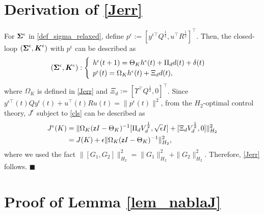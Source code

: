 \documentclass[preprint,5p,times,twocolumn]{elsarticle}
\newcommand{\bm}[1]{{\mbox{\boldmath $#1$}}}
\def\qed{\hfill $\blacksquare$}
\begin{document}
\section{Derivation of \eqref{Jerr}}\label{prf_Jerr}
For ${\bm \Sigma}^{\epsilon}$ in \eqref{def_sigma_relaxed}, define $p^{\epsilon} := [y^{\epsilon\top}Q^{\frac{1}{2}}, u^{\top}R^{\frac{1}{2}}]^{\top}$. Then, the closed-loop $({\bm \Sigma}^{\epsilon}, {\bm K}^{\epsilon})$ with $p^{\epsilon}$ can be described as 
\begin{align}\label{cls}
\hspace{-4mm} ({\bm \Sigma}^{\epsilon}, {\bm K}^{\epsilon}): 
    \begin{cases}\hspace{-1pt}
    \hspace{-2mm}&h^{\epsilon}(t+1) = \Theta_K h^{\epsilon}(t) + \Pi_d d(t) + \delta (t)\\
    \hspace{-2mm}&p^{\epsilon}(t) = \Omega_K h^{\epsilon}(t) + \Xi_d d(t),
\end{cases}
\end{align}
where $\Omega_K$ is defined in \eqref{Jerr} and $\Xi_d := [\Upsilon^{\top}Q^{\frac{1}{2}}, 0]^{\top}$. Since $y^{\epsilon\top}(t)Qy^{\epsilon}(t) + u^{\top}(t)Ru(t) = \|p^{\epsilon}(t)\|^2$, from the $H_2$-optimal control theory\cite{chen2012optimal}, $J^{\epsilon}$ subject to \eqref{cls} can be described as 
\begin{align}
    J^{\epsilon}(K) &= \|\Omega_K ({\sf z}I - \Theta_K)^{-1} [\Pi_d V^{\frac{1}{2}}_d, \sqrt{\epsilon}I] + [\Xi_d V^{\frac{1}{2}}_d,0] \|_{H_2}^2 \nonumber \\
    & = J(K) + {\epsilon} \|\Omega_K ({\sf z}I - \Theta_K)^{-1}\|_{H_2}^2,  
\end{align}
where we used the fact $\|[G_1,G_2]\|_{H_2}^2 = \|G_1\|_{H_2}^2 + \|G_2\|_{H_2}^2$. Therefore, \eqref{Jerr} follows. \qed

\section{Proof of Lemma \ref{lem_nablaJ}}\label{prf_lem_nablaJ}

\end{document}

